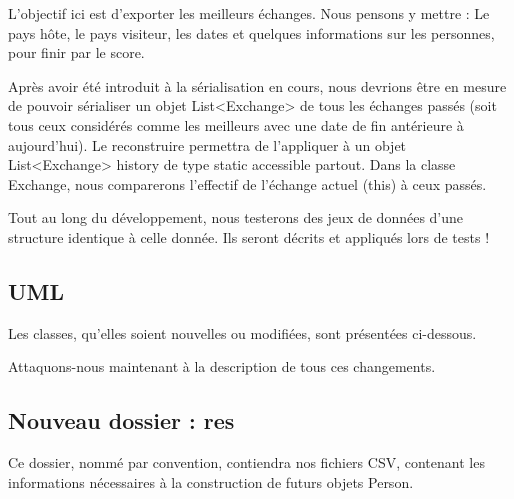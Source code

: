 \documentclass{mytex}
\begin{document}

L'objectif ici est d'exporter les meilleurs échanges.
Nous pensons y mettre : Le pays hôte, le pays visiteur, les dates et quelques informations sur les personnes, pour finir par le score.


Après avoir été introduit à la sérialisation en cours, nous devrions être en mesure de pouvoir sérialiser un objet List<Exchange> de tous les échanges passés (soit tous ceux considérés comme les meilleurs avec une date de fin antérieure à aujourd'hui). Le reconstruire permettra de l'appliquer à un objet List<Exchange> history de type static accessible partout. Dans la classe Exchange, nous comparerons l'effectif de l'échange actuel (this) à ceux passés.


Tout au long du développement, nous testerons des jeux de données d'une structure identique à celle donnée. Ils seront décrits et appliqués lors de tests !

\subsection{UML}

Les classes, qu'elles soient nouvelles ou modifiées, sont présentées ci-dessous.


Attaquons-nous maintenant à la description de tous ces changements.



\subsection{Nouveau dossier : res}

Ce dossier, nommé par convention, contiendra nos fichiers CSV, contenant les informations nécessaires à la construction de futurs objets Person.
\end{document}
